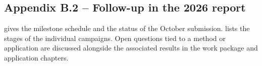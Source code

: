 \subsection*{Appendix B.2 -- Follow-up in the 2026 report}
\label{sec:appendix-b2}

 gives the milestone schedule and the
status of the October submission.  lists the
stages of the individual campaigns. Open questions tied to a method or
application are discussed alongside the associated results in the
work package and application chapters.
